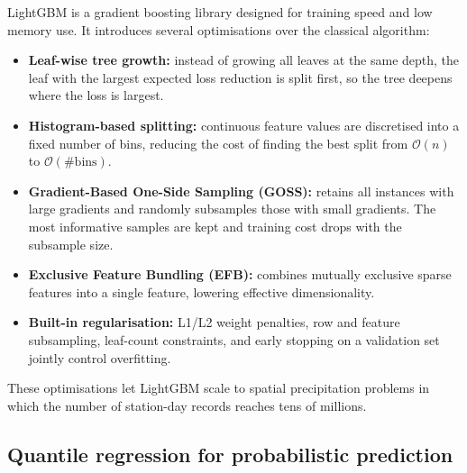 LightGBM \cite{ke2017lightgbm} is a gradient boosting library designed for
training speed and low memory use. It introduces several optimisations over
the classical algorithm:
\begin{itemize}
  \item \textbf{Leaf-wise tree growth:} instead of growing all leaves at the
    same depth, the leaf with the largest expected loss reduction is split
    first, so the tree deepens where the loss is largest.
  \item \textbf{Histogram-based splitting:} continuous feature values are
    discretised into a fixed number of bins, reducing the cost of finding
    the best split from $\mathcal{O}(n)$ to $\mathcal{O}(\#\text{bins})$.
  \item \textbf{Gradient-Based One-Side Sampling (GOSS):} retains all
    instances with large gradients and randomly subsamples those with small
    gradients. The most informative samples are kept and training cost
    drops with the subsample size.
  \item \textbf{Exclusive Feature Bundling (EFB):} combines mutually exclusive
    sparse features into a single feature, lowering effective dimensionality.
  \item \textbf{Built-in regularisation:} L1/L2 weight penalties, row and
    feature subsampling, leaf-count constraints, and early stopping on a
    validation set jointly control overfitting.
\end{itemize}
These optimisations let LightGBM scale to spatial precipitation problems
in which the number of station-day records reaches tens of millions.

\subsection{Quantile regression for probabilistic prediction}
\label{sec:theory-gbm-quantile}

